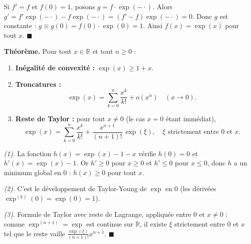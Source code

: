 \begin{mdframed}[style=proofbar]
  Si $f' = f$ et $f(0) = 1$, posons $g = f \cdot \exp(-\cdot)$.
  Alors $g' = f'\exp(-\cdot) - f\exp(-\cdot) = (f'-f)\exp(-\cdot) = 0$.
  Donc $g$ est constante : $g \equiv g(0) = f(0)\cdot\exp(0) = 1$.
  Ainsi $f(x) = \exp(x)$ pour tout $x$. \hfill$\blacksquare$
\end{mdframed}

\decsep{}


\begin{tcolorbox}[thmbox]
  \textbf{Théorème.}\enspace%
  Pour tout $x \in \mathbb{R}$ et tout $n \geq 0$ :
  \begin{enumerate}
    \item \textbf{Inégalité de convexité :} $\exp(x) \geq 1 + x$.
    \item \textbf{Troncatures :}
    \[
      \exp(x) = \sum_{k=0}^n \frac{x^k}{k!} + o(x^n) \quad (x\to 0).
    \]
    \item \textbf{Reste de Taylor :} pour tout $x \neq 0$
          (le cas $x = 0$ étant immédiat),
    \[
      \exp(x) = \sum_{k=0}^n \frac{x^k}{k!} + \frac{x^{n+1}}{(n+1)!}\,\exp(\xi),
      \quad \xi \text{ strictement entre } 0 \text{ et } x.
    \]
  \end{enumerate}
\end{tcolorbox}

\begin{mdframed}[style=proofbar]
  \textit{(1).} La fonction $h(x) = \exp(x) - 1 - x$ vérifie $h(0) = 0$ et
  $h'(x) = \exp(x) - 1$. Or $h' \geq 0$ pour $x \geq 0$ et $h' \leq 0$ pour
  $x \leq 0$, donc $h$ a un minimum global en $0$ : $h(x) \geq 0$ pour tout $x$.

  \textit{(2).} C'est le développement de Taylor-Young de $\exp$ en $0$
  (les dérivées $\exp^{(k)}(0) = \exp(0) = 1$).

  \textit{(3).} Formule de Taylor avec reste de Lagrange, appliquée entre
  $0$ et $x \neq 0$ : comme $\exp^{(n+1)} = \exp$ est continue sur $\mathbb{R}$,
  il existe $\xi$ strictement entre $0$ et $x$ tel que le reste vaille
  $\tfrac{\exp(\xi)}{(n+1)!}x^{n+1}$.
  \hfill$\blacksquare$
\end{mdframed}

\decsep{}

